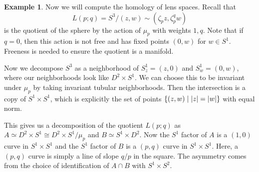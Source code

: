 \documentclass[leqno, openany]{memoir}
\theoremstyle{definition}
\newtheorem{exm}[thm]{Example}
\theoremstyle{remark}
\theoremstyle{plain}
\theoremstyle{definition}
\theoremstyle{remark}
\begin{document}
\begin{exm}
    Now we will compute the homology of lens spaces. Recall that 
    \[ L(p;q) = S^3/(z,w) \sim (\zeta_p z, \zeta_p^q w) \]
    is the quotient of the sphere by the action of $\mu_p$ with weights $1,q$. Note that if $q=0$, then this action is not free and has fixed points $(0,w)$ for $w \in S^1$. Freeness is needed to ensure the quotient is a manifold.

    Now we decompose $S^3$ as a neighborhood of $S^1_z = (z,0)$ and $S^1_w = (0,w)$, where our neighborhoods look like $D^2 \times S^1$. We can choose this to be invariant under $\mu_p$ by taking invariant tubular neighborhoods. Then the intersection is a copy of $S^1 \times S^1$, which is explicitly the set of points $\qty{(z,w) \mid \abs{z} = \abs{w}}$ with equal norm.

    This gives us a decomposition of the quotient $L(p;q)$ as $A \simeq D^2 \times S^1 \cong D^2 \times S^1 / \mu_p$ and $B \simeq S^1 \times D^2$. Now the $S^1$ factor of $A$ is a $(1,0)$ curve in $S^1 \times S^1$ and the $S^1$ factor of $B$ is a $(p,q)$ curve in $S^1 \times S^1$. Here, a $(p,q)$ curve is simply a line of slope $q/p$ in the square. The asymmetry comes from the choice of identification of $A \cap B$ with $S^1 \times S^2$.


\end{exm}
\end{document}
